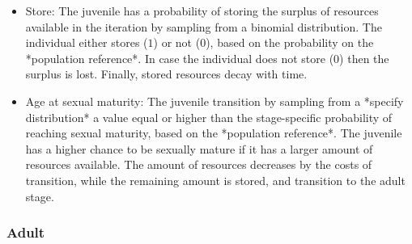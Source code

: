 \documentclass{article}
\begin{document}
\begin{itemize}
    \item Store: The juvenile has a probability of storing the surplus of resources available in the iteration by sampling from a binomial distribution. The individual either stores ($1$) or not ($0$), based on the probability on the *population reference*. In case the individual does not store ($0$) then the surplus is lost. Finally, stored resources decay with time.
    \item Age at sexual maturity: The juvenile transition by sampling from a *specify distribution* a value equal or higher than the stage-specific probability of reaching sexual maturity, based on the *population reference*. The juvenile has a higher chance to be sexually mature if it has a larger amount of resources available. The amount of resources decreases by the costs of transition, while the remaining amount is stored, and transition to the adult stage.
\end{itemize}

\subsubsection{Adult}
\end{document}
